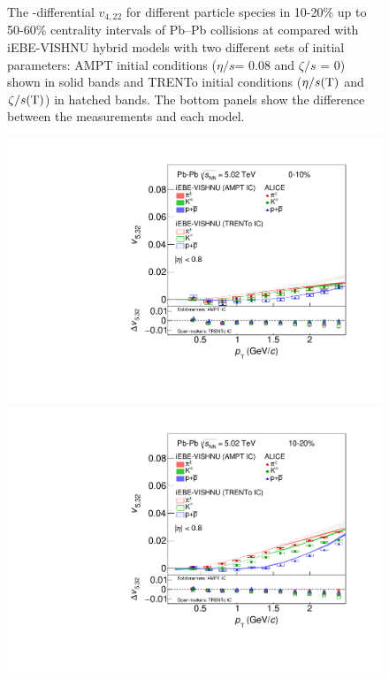 \begin{figure}[!htb]
\begin{center}
\end{center}
\caption{The \pT-differential $v_{4,22}$ for different particle species in 10-20\% up to 50-60\% centrality intervals of Pb--Pb collisions at \sNN compared with iEBE-VISHNU hybrid models with two different sets of initial parameters: AMPT initial conditions ($\eta/s$= 0.08 and $\zeta/s$ = 0) shown in solid bands and TRENTo initial conditions ($\eta/s({\rm T})$ and $\zeta/s({\rm T})$) in hatched bands. The bottom panels show the difference between the measurements and each model.}
\label{v422_model}
\end{figure}


\begin{figure}[!htb]
\begin{center}
\includegraphics[scale=0.26]{figures/model/TrentoAndAMPT_v523_gap00_new_0-10_PID2.pdf}
\includegraphics[scale=0.26]{figures/model/TrentoAndAMPT_v523_gap00_new_10-20_PID2.pdf}

\end{center}
\end{figure}
